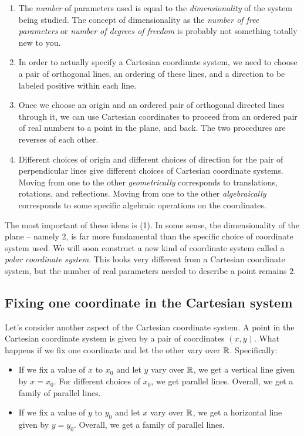 \documentclass[10pt]{amsart}
\begin{document}
\begin{enumerate}
\item The {\em number} of parameters used is equal to the {\em
  dimensionality} of the system being studied. The concept of
  dimensionality as the {\em number of free parameters} or {\em number
  of degrees of freedom} is probably not something totally new to you.
\item In order to actually specify a Cartesian coordinate system, we
  need to choose a pair of orthogonal lines, an ordering of these
  lines, and a direction to be labeled positive within each line.
\item Once we choose an origin and an ordered pair of orthogonal
  directed lines through it, we can use Cartesian coordinates to
  proceed from an ordered pair of real numbers to a point in the
  plane, and back. The two procedures are reverses of each other.
\item Different choices of origin and different choices of direction
  for the pair of perpendicular lines give different choices of
  Cartesian coordinate systems. Moving from one to the other {\em
  geometrically} corresponds to translations, rotations, and
  reflections. Moving from one to the other {\em algebraically}
  corresponds to some specific algebraic operations on the
  coordinates.
\end{enumerate}

The most important of these ideas is (1). In some sense, the
dimensionality of the plane -- namely $2$, is far more fundamental
than the specific choice of coordinate system used. We will soon
construct a new kind of coordinate system called a {\em polar
coordinate system}. This looks very different from a Cartesian
coordinate system, but the number of real parameters needed to
describe a point remains $2$.

\subsection{Fixing one coordinate in the Cartesian system}

Let's consider another aspect of the Cartesian coordinate system. A
point in the Cartesian coordinate system is given by a pair of
coordinates $(x,y)$. What happens if we fix one coordinate and let the
other vary over $\mathbb{R}$. Specifically:

\begin{itemize}
\item If we fix a value of $x$ to $x_0$ and let $y$ vary over $\mathbb{R}$, we
  get a vertical line given by $x = x_0$. For different choices of
  $x_0$, we get parallel lines. Overall, we get a family of parallel
  lines.
\item If we fix a value of $y$ to $y_0$ and let $x$ vary over $\mathbb{R}$, we
  get a horizontal line given by $y = y_0$. Overall, we get a family
  of parallel lines.
\end{itemize}
\end{document}
